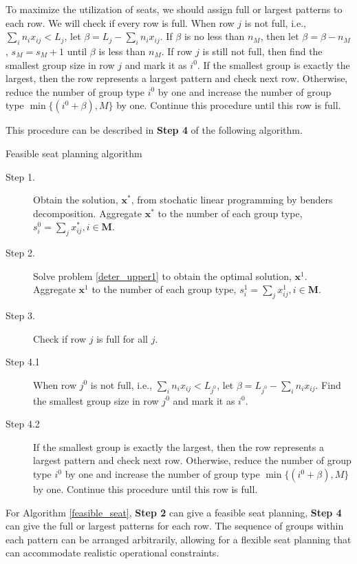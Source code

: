To maximize the utilization of seats, we should assign full or largest patterns to each row. We will check if every row is full. When row $j$ is not full, i.e., $\sum_{i} n_{i} x_{ij} < L_{j}$, let $\beta = L_{j} - \sum_{i} n_{i} x_{ij}$. If $\beta$ is no less than $n_M$, then let $\beta = \beta - n_M$, $s_M = s_M +1$ until $\beta$ is less than $n_M$. If row $j$ is still not full, then find the smallest group size in row $j$ and mark it as $i^0$. If the smallest group is exactly the largest, then the row represents a largest pattern and check next row. Otherwise, reduce the number of group type $i^0$ by one and increase the number of group type $\min \{(i^0+\beta), M\}$ by one. Continue this procedure until this row is full.


This procedure can be described in {\bf Step 4} of the following algorithm.

\begin{algorithm}[H]
  \caption{Feasible seat planning algorithm}\label{feasible_seat}
    \begin{description}
    \item[Step 1.] Obtain the solution, $\mathbf{x}^{*}$, from stochatic linear programming by benders decomposition. Aggregate $\mathbf{x}^{*}$ to the number of each group type, ${s}_{i}^{0} =\sum_{j} x^{*}_{ij}, i \in \mathbf{M}$.

    \item[Step 2.] Solve problem \eqref{deter_upper1} to obtain the optimal solution, $\mathbf{x}^{1}$. Aggregate $\mathbf{x}^{1}$ to the number of each group type, ${s}_{i}^{1} = \sum_{j} x^{1}_{ij}, i \in \mathbf{M}$.
    
    \item[Step 3.] Check if row $j$ is full for all $j$. 
    \item[Step 4.1] When row $j^{0}$ is not full, i.e., $\sum_{i} n_{i} x_{ij} < L_{j^{0}}$, let $\beta = L_{j^{0}} - \sum_{i} n_{i} x_{ij}$. Find the smallest group size in row $j^{0}$ and mark it as $i^0$.
    \item[Step 4.2] If the smallest group is exactly the largest, then the row represents a largest pattern and check next row. Otherwise, reduce the number of group type $i^0$ by one and increase the number of group type $\min \{(i^0+\beta), M\}$ by one. Continue this procedure until this row is full.
   \end{description}
  \end{algorithm}

For Algorithm \ref{feasible_seat}, {\bf Step 2} can give a feasible seat planning, {\bf Step 4} can give the full or largest patterns for each row. The sequence of groups within each pattern can be arranged arbitrarily, allowing for a flexible seat planning that can accommodate realistic operational constraints. 

